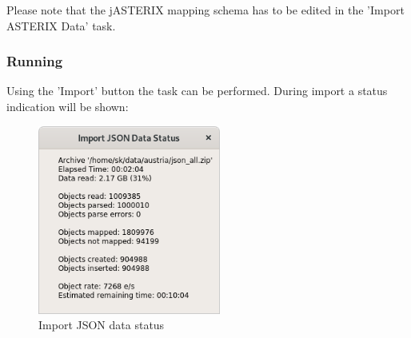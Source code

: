 Please note that the jASTERIX mapping schema has to be edited in the 'Import ASTERIX Data' task.


% 
% 

\subsubsection{Running}

Using the 'Import' button the task can be performed. During import a status indication will be shown:

\begin{figure}[H]
  \center
    \includegraphics[width=6cm]{figures/json_import_status.png}
  \caption{Import JSON data status}
\end{figure}

